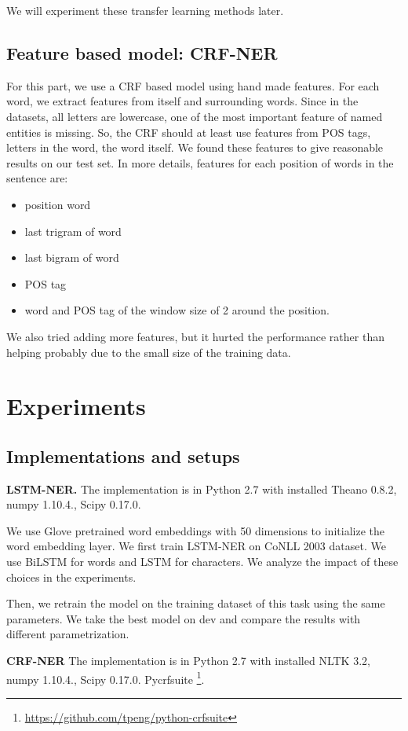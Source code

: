 \documentclass[11pt]{article}
\begin{document}
We will experiment these transfer learning methods later.
\subsection{Feature based model: CRF-NER}
For this part, we use a CRF based model using hand made features. 
For each word, we extract features from itself and surrounding words.
Since in the datasets, all letters are lowercase, one of the 
most important feature of named entities is missing. 
So, the CRF should at least use features from POS tags, letters in the word, the word itself.
We found these features to give reasonable results on our test set. 
In more details, features for each position of words in the sentence are:
\begin{itemize}
\item 
position word 
\item 
last trigram of word
\item 
last bigram of word
\item 
POS tag
\item 
word and POS tag of the window size of 2 around the position.
\end{itemize}

We also tried adding more features, but it hurted the performance rather than helping
probably due to the small size of the training data. 

\section{Experiments}
\subsection{Implementations and setups}
\textbf{LSTM-NER.}
The implementation is in Python 2.7 with
installed Theano 0.8.2, numpy 1.10.4., Scipy 0.17.0. 

We use Glove pretrained word embeddings with 50 dimensions to initialize the 
word embedding layer.
We first train LSTM-NER on CoNLL 2003 dataset. 
We use BiLSTM for words and LSTM for characters. 
We analyze the impact of these choices in the experiments.

Then, we retrain the model on the training dataset of this task using 
the same parameters. 
We take the best model on dev and compare the results with different parametrization. 

\textbf{CRF-NER}
The implementation is in Python 2.7 with
installed NLTK 3.2, numpy 1.10.4., Scipy 0.17.0. 
Pycrfsuite \footnote{\url{https://github.com/tpeng/python-crfsuite}}.
\end{document}
